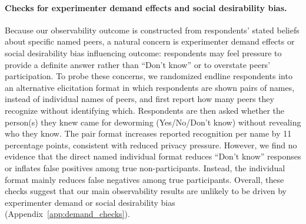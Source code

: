 \documentclass[12pt,a4paper]{article}
\begin{document}
\paragraph{Checks for experimenter demand effects and social desirability bias.} Because our observability outcome is constructed from respondents’ stated beliefs about specific named peers, a natural concern is experimenter demand effects or social desirability bias influencing outcome: respondents may feel pressure to provide a definite answer rather than ``Don’t know'' or to overstate peers’ participation. To probe these concerns, we randomized endline respondents into an alternative elicitation format in which respondents are shown pairs of names, instead of individual names of peers, and first report how many peers they recognize without identifying which. Respondents are then asked whether the person(s) they knew came for deworming (Yes/No/Don’t know) without revealing who they know. The pair format increases reported recognition per name by 11 percentage points, consistent with reduced privacy pressure. However, we find no evidence that the direct named individual format reduces ``Don’t know'' responses or inflates false positives among true non-participants. Instead, the individual format mainly reduces false negatives among true participants. Overall, these checks suggest that our main observability results are unlikely to be driven by experimenter demand or social desirability bias (Appendix~\ref{app:demand_checks}).%

\end{document}
